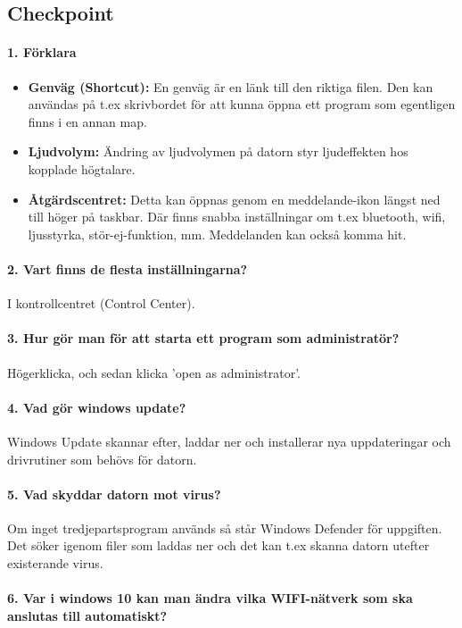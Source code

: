 \subsection{Checkpoint}

\paragraph{1. Förklara}
\begin{itemize}
	\item \textbf{Genväg (Shortcut):} En genväg är en länk till den riktiga filen. Den kan användas på t.ex skrivbordet för att kunna öppna ett program som egentligen finns i en annan map.
	\item \textbf{Ljudvolym:} Ändring av ljudvolymen på datorn styr ljudeffekten hos kopplade högtalare.
	\item \textbf{Åtgärdscentret:} Detta kan öppnas genom en meddelande-ikon längst ned till höger på taskbar. Där finns snabba inställningar om t.ex bluetooth, wifi, ljusstyrka, stör-ej-funktion, mm. Meddelanden kan också komma hit.
\end{itemize} 

\paragraph{2. Vart finns de flesta inställningarna?}
I kontrollcentret (Control Center).

\paragraph{3. Hur gör man för att starta ett program som administratör?}
Högerklicka, och sedan klicka 'open as administrator'.

\paragraph{4. Vad gör windows update?}
Windows Update skannar efter, laddar ner och installerar nya uppdateringar och drivrutiner som behövs för datorn.

\paragraph{5. Vad skyddar datorn mot virus?}
Om inget tredjepartsprogram används så står Windows Defender för uppgiften. Det söker igenom filer som laddas ner och det kan t.ex skanna datorn utefter existerande virus.

\paragraph{6. Var i windows 10 kan man ändra vilka WIFI-nätverk som ska anslutas till automatiskt?}



